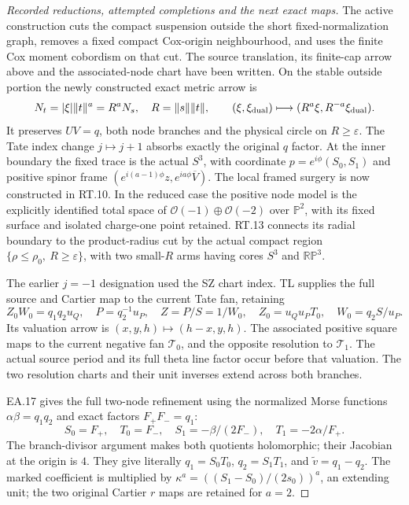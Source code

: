 \begin{proof}[Recorded reductions, attempted completions and the next exact maps]
The active construction cuts the compact suspension outside
the short fixed-normalization graph, removes a fixed compact
Cox-origin neighbourhood, and uses the finite Cox moment
cobordism on that cut. The source translation, its finite-cap
arrow above and the associated-node chart have been written.
On the stable outside portion the newly constructed exact
metric arrow is
\[
 N_t=|\xi|\|t\|^a=R^aN_s,\quad R=\|s\|\|t\|,\qquad
 (\xi,\xi_{\rm dual})\longmapsto
 (R^a\xi,R^{-a}\xi_{\rm dual}).
\]
It preserves \(UV=q\), both node branches and the physical
circle on \(R\ge\varepsilon\). The Tate index change
\(j\mapsto j+1\) absorbs exactly the original \(q\)
factor. At the inner boundary the fixed trace is the actual
\(S^3\), with coordinate \(p=e^{i\phi}(S_0,S_1)\) and
positive spinor frame
\((e^{i(a-1)\phi}z,e^{ia\phi}\overline V)\).
The local framed surgery is now constructed in RT.10. In the
reduced case the positive node model is the explicitly identified
total space of \(\mathcal O(-1)\oplus\mathcal O(-2)\) over
\(\mathbb P^2\), with its fixed surface and isolated charge-one
point retained. RT.13 connects its radial boundary to the
product-radius cut by the actual compact region
\(\{\rho\le\rho_0,\ R\ge\varepsilon\}\), with two small-\(R\)
arms having cores \(S^3\) and \(\mathbb{RP}^3\).

The earlier \(j=-1\) designation used the SZ chart index.
TL supplies the full source and Cartier map to the current Tate
fan, retaining
\[
 Z_0W_0=q_1q_2u_Q,\quad P=q_2^{-1}u_P,\quad
 Z=P/S=1/W_0,\quad Z_0=u_Qu_PT_0,\quad W_0=q_2S/u_P.
\]
Its valuation arrow is \((x,y,h)\mapsto(h-x,y,h)\).
The associated positive square maps to the current negative
fan \(\mathcal T_0\), and the opposite resolution to
\(\mathcal T_1\). The actual source period and its full theta
line factor occur before that valuation. The two resolution
charts and their unit inverses extend across both branches.

EA.17 gives the full two-node refinement using the normalized
Morse functions \(\alpha\beta=q_1q_2\) and exact factors
\(F_+F_-=q_1\):
\[
 S_0=F_+,\quad T_0=F_-,\quad
 S_1=-\beta/(2F_-),\quad T_1=-2\alpha/F_+.
\]
The branch-divisor argument makes both quotients holomorphic;
their Jacobian at the origin is \(4\). They give literally
\(q_1=S_0T_0\), \(q_2=S_1T_1\), and
\(\widetilde v=q_1-q_2\). The marked coefficient is multiplied
by \(\kappa^a=((S_1-S_0)/(2s_0))^a\), an extending unit;
the two original Cartier \(r\) maps are retained for \(a=2\).


\end{proof}
